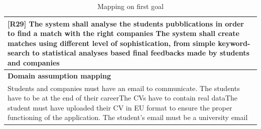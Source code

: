 \documentclass{article}
\begin{document}
\begin{table}[H]
\begin{tabular}{|p{11cm}|}
        [R29] The system shall analyse the students pubblications in order to find a match with the right companies \newline
        [R31] The system shall create matches using different level of sophistication, from simple keyword-search to statistical analyses based final feedbacks made by students and companies \newline\\
         \hline
         \textbf{Domain assumption mapping}\\
         \hline
         [D5] Students and companies must have an email to communicate. \newline
         [D1] The students have to be at the end of their career\newline
         [D2] The CVs have to contain real data\newline
         [D4] The student must have uploaded their CV in EU format to ensure the proper functioning of the application. \newline
         [D6] The student's email must be a university email \newline\\
         \hline
    \end{tabular}
    \caption{Mapping on first goal}
    \label{tab:my_label}
\end{table}
\end{document}

